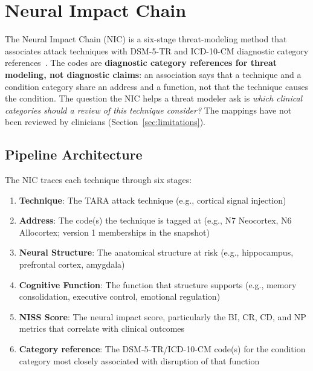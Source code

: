 
\section{Neural Impact Chain}
\label{sec:nic}

The Neural Impact Chain (NIC) is a six-stage threat-modeling method that associates
attack techniques with DSM-5-TR and ICD-10-CM diagnostic category
references~\cite{apa2022dsm5tr}. The codes are \textbf{diagnostic category references for
threat modeling, not diagnostic claims}: an association says that a technique and a
condition category share an address and a function, not that the technique causes the
condition. The question the NIC helps a threat modeler ask is \emph{which clinical
categories should a review of this technique consider?} The mappings have not been reviewed
by clinicians (Section~\ref{sec:limitations}).

\subsection{Pipeline Architecture}

The NIC traces each technique through six stages:

\begin{enumerate}
  \item \textbf{Technique}: The TARA attack technique (e.g., cortical signal
        injection)
  \item \textbf{Address}: The code(s) the technique is tagged at (e.g., N7
        Neocortex, N6 Allocortex; version 1 memberships in the snapshot)
  \item \textbf{Neural Structure}: The anatomical structure at risk (e.g.,
        hippocampus, prefrontal cortex, amygdala)
  \item \textbf{Cognitive Function}: The function that structure supports (e.g.,
        memory consolidation, executive control, emotional regulation)
  \item \textbf{NISS Score}: The neural impact score, particularly the BI, CR,
        CD, and NP metrics that correlate with clinical outcomes
  \item \textbf{Category reference}: The DSM-5-TR/ICD-10-CM code(s) for the
        condition category most closely associated with disruption of that function
\end{enumerate}


